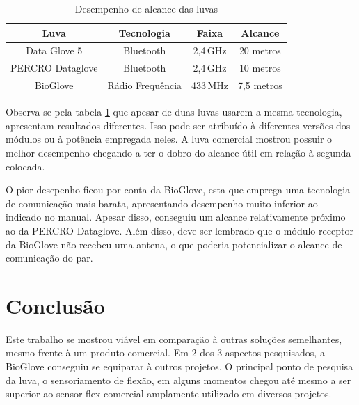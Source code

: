 \documentclass[
	12pt,				%
	openright,			%
	oneside,			%
	a4paper,			%
	english,			%
	brazil				%
	]{abntex2}
\begin{document}
		\begin{table}[H]
  	\centering
		\caption{Desempenho de alcance das luvas}
    \begin{tabular}{c|c|c|c}
      \midrule
			Luva 						& Tecnologia			&	Faixa		& Alcance		\\
      \midrule                                            					
			Data Glove 5		& Bluetooth				& 2,4$\,$GHz	& 20 metros	\\
			PERCRO Dataglove& Bluetooth				& 2,4$\,$GHz	& 10 metros	\\
			BioGlove				& Rádio Frequência& 433$\,$MHz	&	7,5 metros\\	
      \midrule
    \end{tabular}
		\label{Tab:wifi-range}
		\end{table}

			Observa-se pela tabela \ref{Tab:wifi-range} que apesar de duas luvas usarem a mesma tecnologia, apresentam resultados diferentes. Isso pode ser atribuído à diferentes versões dos módulos ou à potência empregada neles. A luva comercial mostrou possuir o melhor desempenho chegando a ter o dobro do alcance útil em relação à segunda colocada.

			O pior desepenho ficou por conta da BioGlove, esta que emprega uma tecnologia de comunicação mais barata, apresentando desempenho muito inferior ao indicado no manual. Apesar disso, conseguiu um alcance relativamente próximo ao da PERCRO Dataglove. Além disso, deve ser lembrado que o módulo receptor da BioGlove não recebeu uma antena, o que poderia potencializar o alcance de comunicação do par.







		\chapter{Conclusão}

		Este trabalho se mostrou viável em comparação à outras soluções semelhantes, mesmo frente à um produto comercial. Em 2 dos 3 aspectos pesquisados, a BioGlove conseguiu se equiparar à outros projetos. O principal ponto de pesquisa da luva, o sensoriamento de flexão, em alguns momentos chegou até mesmo a ser superior ao sensor flex comercial amplamente utilizado em diversos projetos.
\end{document}
